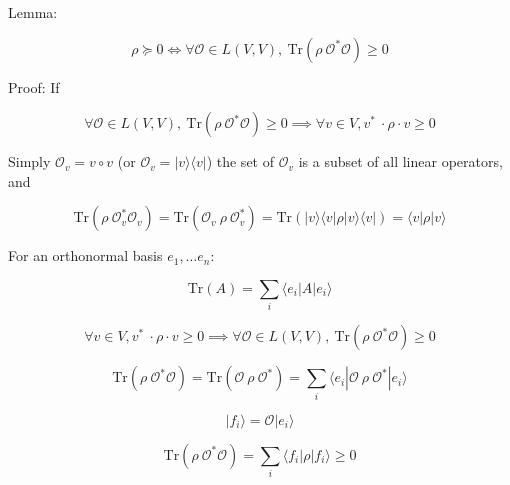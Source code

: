 \documentclass{article}
\theoremstyle{definition}
\begin{document}
Lemma:

\begin{equation}
    \rho \succcurlyeq 0
    \iff
    \forall \mathcal{O} \in L(V,V), \ \mathrm{Tr}(\rho \ \mathcal{O}^* \mathcal{O}) \ge0
\end{equation}

Proof:
If

\begin{equation}
    \forall \mathcal{O} \in L(V,V), \ \mathrm{Tr}(\rho \ \mathcal{O}^* \mathcal{O}) \ge0
    \implies
    \forall v\in V, v^* \ \cdot \rho \cdot v \ge 0
\end{equation}

Simply $\mathcal{O}_v = v \circ v$ (or $\mathcal{O}_v=|v\rangle\langle v|$) the set of $\mathcal{O}_v$ is a subset of all linear operators, and

\begin{equation}
    \mathrm{Tr}(\rho \ \mathcal{O}_v^* \mathcal{O}_v)
    =
    \mathrm{Tr}(\mathcal{O}_v \ \rho \ \mathcal{O}_v^*)
    =
    \mathrm{Tr}(|v\rangle\langle v| \rho |v\rangle\langle v|)
    =
    \langle v| \rho |v\rangle
\end{equation}

For an orthonormal basis $e_1, \dots e_n$:

\begin{equation}
    \mathrm{Tr}(A) = \sum_{i} \langle e_i | A | e_i \rangle
\end{equation}

\begin{equation}
    \forall v\in V, v^* \ \cdot \rho \cdot v \ge 0
    \implies
    \forall \mathcal{O} \in L(V,V), \ \mathrm{Tr}(\rho \ \mathcal{O}^* \mathcal{O}) \ge0
\end{equation}

\begin{equation}
    \mathrm{Tr}(\rho \ \mathcal{O}^* \mathcal{O})
    =
    \mathrm{Tr}(\mathcal{O} \ \rho \ \mathcal{O}^*)
    =
    \sum_{i} \langle e_i | \mathcal{O} \ \rho \ \mathcal{O}^* | e_i \rangle
\end{equation}

\begin{equation}
    |f_i \rangle = \mathcal{O} | e_i \rangle 
\end{equation}

\begin{equation}
    \mathrm{Tr}(\rho \ \mathcal{O}^* \mathcal{O})
    =
    \sum_i \langle f_i |  \rho | f_i \rangle
    \ge
    0
\end{equation}
\end{document}
